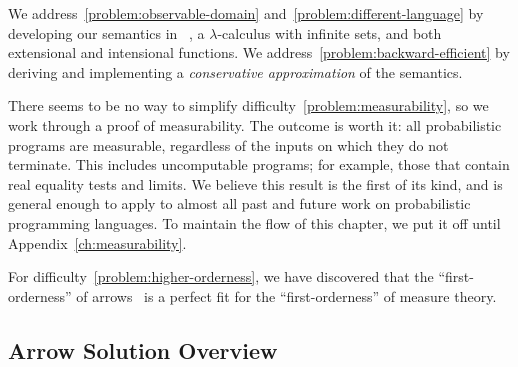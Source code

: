 We address~\ref{problem:observable-domain} and~\ref{problem:different-language} by developing our semantics in \lzfclang~\cite{cit:toronto-2012flops-lzfc}, a $\lambda$-calculus with infinite sets, and both extensional and intensional functions.
We address~\ref{problem:backward-efficient} by deriving and implementing a \emph{conservative approximation} of the semantics.

There seems to be no way to simplify difficulty~\ref{problem:measurability}, so we work through a proof of measurability.
The outcome is worth it: all probabilistic programs are measurable, regardless of the inputs on which they do not terminate.
This includes uncomputable programs; for example, those that contain real equality tests and limits.
We believe this result is the first of its kind, and is general enough to apply to almost all past and future work on probabilistic programming languages.
To maintain the flow of this chapter, we put it off until Appendix~\ref{ch:measurability}.

For difficulty~\ref{problem:higher-orderness}, we have discovered that the ``first-orderness'' of arrows~\cite{cit:hughes-2000scp-arrows} is a perfect fit for the ``first-orderness'' of measure theory.


\subsection{Arrow Solution Overview}

\newcommand{\youarehere}[1]%
{%
\begin{equation}%
\begin{CD}%
X \botto Y   @>\liftmap>>   X \mapto Y   @>\liftpre>>   X \preto Y \\%
@V{\eta_\pbot}VV             @VV{\eta\pmap}V              @VV{\eta\ppre}V\\%
X \pbotto Y  @>>\liftpmap>  X \pmapto Y  @>>\liftppre>  X \ppreto Y%
\end{CD}%
\label{#1}%
\end{equation}%
}

